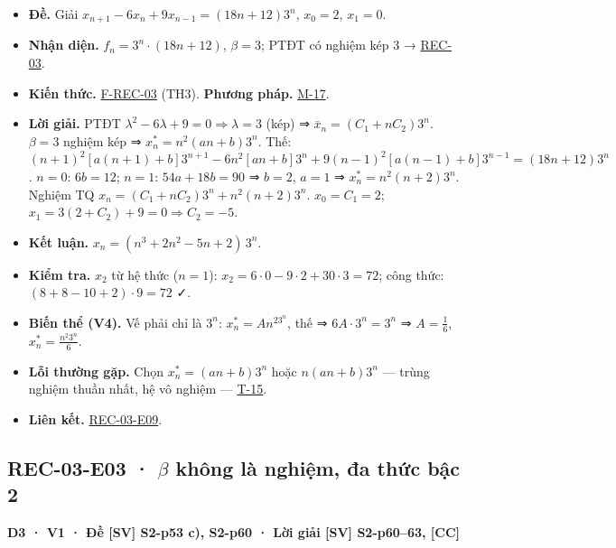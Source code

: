 \documentclass[
  10pt,
  twoside,openany]{book}
\providecommand{\tightlist}{%
  \setlength{\itemsep}{0pt}\setlength{\parskip}{0pt}}
\begin{document}
\begin{itemize}
\tightlist
\item
  \textbf{Đề.} Giải \(x_{n+1}-6x_n+9x_{n-1}=(18n+12)3^n\), \(x_0=2\),
  \(x_1=0\).
\item
  \textbf{Nhận diện.} \(f_n=3^n\cdot(18n+12)\), \(\beta=3\); PTĐT có
  nghiệm kép 3 → \protect\hyperlink{REC-03}{REC-03}.
\item
  \textbf{Kiến thức.} \protect\hyperlink{F-REC-03}{F-REC-03} (TH3).
  \textbf{Phương pháp.} \protect\hyperlink{M-17}{M-17}.
\item
  \textbf{Lời giải.} PTĐT \(\lambda^2-6\lambda+9=0\Rightarrow\lambda=3\)
  (kép) ⇒ \(\bar x_n=(C_1+nC_2)3^n\). \(\beta=3\) nghiệm kép ⇒
  \(x_n^*=n^2(an+b)3^n\). Thế:
  \((n+1)^2[a(n+1)+b]3^{n+1}-6n^2[an+b]3^n+9(n-1)^2[a(n-1)+b]3^{n-1}=(18n+12)3^n\).
  \(n=0\): \(6b=12\); \(n=1\): \(54a+18b=90\) ⇒ \(b=2\), \(a=1\) ⇒
  \(x_n^*=n^2(n+2)3^n\). Nghiệm TQ \(x_n=(C_1+nC_2)3^n+n^2(n+2)3^n\).
  \(x_0=C_1=2\); \(x_1=3(2+C_2)+9=0\Rightarrow C_2=-5\).
\item
  \textbf{Kết luận.} \(x_n=(n^3+2n^2-5n+2)\,3^n\).
\item
  \textbf{Kiểm tra.} \(x_2\) từ hệ thức (\(n=1\)):
  \(x_2=6\cdot0-9\cdot2+30\cdot3=72\); công thức:
  \((8+8-10+2)\cdot9=72\) ✓.
\item
  \textbf{Biến thể (V4).} Vế phải chỉ là \(3^n\): \(x_n^*=An^23^n\), thế
  ⇒ \(6A\cdot3^n=3^n\) ⇒ \(A=\frac16\), \(x_n^*=\frac{n^2 3^n}{6}\).
\item
  \textbf{Lỗi thường gặp.} Chọn \(x_n^*=(an+b)3^n\) hoặc \(n(an+b)3^n\)
  --- trùng nghiệm thuần nhất, hệ vô nghiệm ---
  \protect\hyperlink{T-15}{T-15}.
\item
  \textbf{Liên kết.} \protect\hyperlink{REC-03-E09}{REC-03-E09}.
\end{itemize}

\hypertarget{REC-03-E03}{%
\subsection{\texorpdfstring{REC-03-E03 · \(\beta\) không là nghiệm, đa
thức bậc
2}{REC-03-E03 · \textbackslash beta không là nghiệm, đa thức bậc 2}}\label{REC-03-E03}}

\textbf{D3 · V1 · Đề {[}SV{]} S2-p53 c), S2-p60 · Lời giải {[}SV{]}
S2-p60--63, {[}CC{]}}
\end{document}
